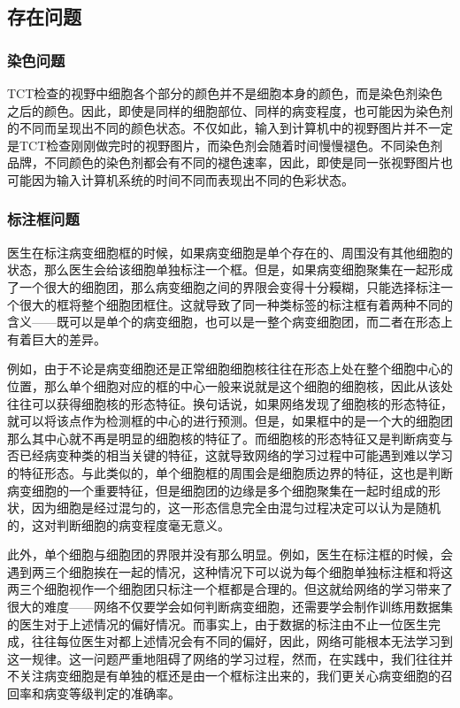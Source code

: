 \subsection{存在问题}
\subsubsection{染色问题}
\par TCT检查的视野中细胞各个部分的颜色并不是细胞本身的颜色，而是染色剂染色之后的颜色。因此，即使是同样的细胞部位、同样的病变程度，也可能因为染色剂的不同而呈现出不同的颜色状态。不仅如此，输入到计算机中的视野图片并不一定是TCT检查刚刚做完时的视野图片，而染色剂会随着时间慢慢褪色。不同染色剂品牌，不同颜色的染色剂都会有不同的褪色速率，因此，即使是同一张视野图片也可能因为输入计算机系统的时间不同而表现出不同的色彩状态。
\subsubsection{标注框问题}
\par 医生在标注病变细胞框的时候，如果病变细胞是单个存在的、周围没有其他细胞的状态，那么医生会给该细胞单独标注一个框。但是，如果病变细胞聚集在一起形成了一个很大的细胞团，那么病变细胞之间的界限会变得十分糢糊，只能选择标注一个很大的框将整个细胞团框住。这就导致了同一种类标签的标注框有着两种不同的含义——既可以是单个的病变细胞，也可以是一整个病变细胞团，而二者在形态上有着巨大的差异。
\par 例如，由于不论是病变细胞还是正常细胞细胞核往往在形态上处在整个细胞中心的位置，那么单个细胞对应的框的中心一般来说就是这个细胞的细胞核，因此从该处往往可以获得细胞核的形态特征。换句话说，如果网络发现了细胞核的形态特征，就可以将该点作为检测框的中心的进行预测。但是，如果框中的是一个大的细胞团那么其中心就不再是明显的细胞核的特征了。而细胞核的形态特征又是判断病变与否已经病变种类的相当关键的特征，这就导致网络的学习过程中可能遇到难以学习的特征形态。与此类似的，单个细胞框的周围会是细胞质边界的特征，这也是判断病变细胞的一个重要特征，但是细胞团的边缘是多个细胞聚集在一起时组成的形状，因为细胞是经过混匀的，这一形态信息完全由混匀过程决定可以认为是随机的，这对判断细胞的病变程度毫无意义。
\par 此外，单个细胞与细胞团的界限并没有那么明显。例如，医生在标注框的时候，会遇到两三个细胞挨在一起的情况，这种情况下可以说为每个细胞单独标注框和将这两三个细胞视作一个细胞团只标注一个框都是合理的。但这就给网络的学习带来了很大的难度——网络不仅要学会如何判断病变细胞，还需要学会制作训练用数据集的医生对于上述情况的偏好情况。而事实上，由于数据的标注由不止一位医生完成，往往每位医生对都上述情况会有不同的偏好，因此，网络可能根本无法学习到这一规律。这一问题严重地阻碍了网络的学习过程，然而，在实践中，我们往往并不关注病变细胞是有单独的框还是由一个框标注出来的，我们更关心病变细胞的召回率和病变等级判定的准确率。
